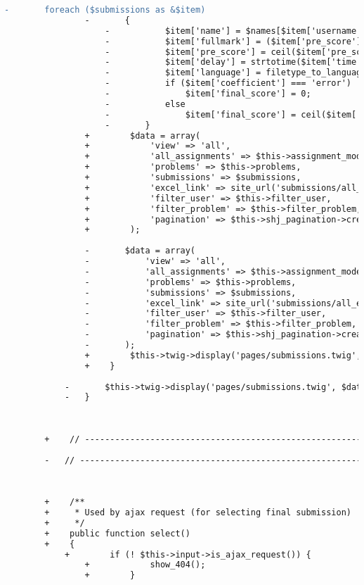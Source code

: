 \begin{lstlisting}[language=diff, caption=Perubahan pada kode Submissions.php]
				-		foreach ($submissions as &$item)
				-		{
					-			$item['name'] = $names[$item['username']];
					-			$item['fullmark'] = ($item['pre_score'] == 10000);
					-			$item['pre_score'] = ceil($item['pre_score']*$this->problems[$item['problem']]['score']/10000);
					-			$item['delay'] = strtotime($item['time'])-strtotime($this->user->selected_assignment['finish_time']);
					-			$item['language'] = filetype_to_language($item['file_type']);
					-			if ($item['coefficient'] === 'error')
					-				$item['final_score'] = 0;
					-			else
					-				$item['final_score'] = ceil($item['pre_score']*$item['coefficient']/100);
					-		}
				+        $data = array(
				+            'view' => 'all',
				+            'all_assignments' => $this->assignment_model->all_assignments(),
				+            'problems' => $this->problems,
				+            'submissions' => $submissions,
				+            'excel_link' => site_url('submissions/all_excel'.($this->filter_user ? '/user/'.$this->filter_user : '').($this->filter_problem ? '/problem/'.$this->filter_problem : '')),
				+            'filter_user' => $this->filter_user,
				+            'filter_problem' => $this->filter_problem,
				+            'pagination' => $this->shj_pagination->create_links(),
				+        );
				
				-		$data = array(
				-			'view' => 'all',
				-			'all_assignments' => $this->assignment_model->all_assignments(),
				-			'problems' => $this->problems,
				-			'submissions' => $submissions,
				-			'excel_link' => site_url('submissions/all_excel'.($this->filter_user?'/user/'.$this->filter_user:'').($this->filter_problem?'/problem/'.$this->filter_problem:'')),
				-			'filter_user' => $this->filter_user,
				-			'filter_problem' => $this->filter_problem,
				-			'pagination' => $this->shj_pagination->create_links(),
				-		);
				+        $this->twig->display('pages/submissions.twig', $data);
				+    }
			
			-		$this->twig->display('pages/submissions.twig', $data);
			-	}
		
		
		
		+    // ------------------------------------------------------------------------
		
		-	// ------------------------------------------------------------------------
		
		
		
		+    /**
		+     * Used by ajax request (for selecting final submission)
		+     */
		+    public function select()
		+    {
			+        if (! $this->input->is_ajax_request()) {
				+            show_404();
				+        }
			

\end{lstlisting}
